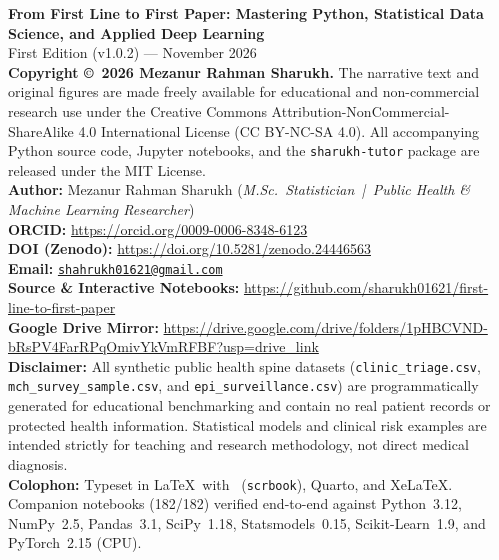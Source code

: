 {  %
  \thispagestyle{empty}
  \vspace*{\fill}
  \begin{flushleft}
  \footnotesize\color{SlateNote}
  \textbf{From First Line to First Paper: Mastering Python, Statistical Data Science, and Applied Deep Learning}\\
  First Edition (v1.0.2) --- November 2026\\[0.9em]
  \textbf{Copyright \copyright\ 2026 Mezanur Rahman Sharukh.} The narrative text and original figures are made freely available for educational and non-commercial research use under the Creative Commons Attribution-NonCommercial-ShareAlike 4.0 International License (CC BY-NC-SA 4.0). All accompanying Python source code, Jupyter notebooks, and the \texttt{sharukh-tutor} package are released under the MIT License.\\[0.9em]
  \textbf{Author:} Mezanur Rahman Sharukh (\textit{M.Sc.\ Statistician \,|\, Public Health \& Machine Learning Researcher})\\
  \textbf{ORCID:} \url{https://orcid.org/0009-0006-8348-6123}\\
  \textbf{DOI (Zenodo):} \url{https://doi.org/10.5281/zenodo.24446563}\\
  \textbf{Email:} \href{mailto:shahrukh01621@gmail.com}{\texttt{shahrukh01621@gmail.com}}\\
  \textbf{Source \& Interactive Notebooks:} \url{https://github.com/sharukh01621/first-line-to-first-paper}\\
  \textbf{Google Drive Mirror:} \url{https://drive.google.com/drive/folders/1pHBCVND-bRsPV4FarRPqOmivYkVmRFBF?usp=drive_link}\\[0.9em]
  \textbf{Disclaimer:} All synthetic public health spine datasets (\texttt{clinic\_triage.csv}, \texttt{mch\_survey\_sample.csv}, and \texttt{epi\_surveillance.csv}) are programmatically generated for educational benchmarking and contain no real patient records or protected health information. Statistical models and clinical risk examples are intended strictly for teaching and research methodology, not direct medical diagnosis.\\[0.9em]
  \textbf{Colophon:} Typeset in \LaTeX\ with \KOMAScript\ (\texttt{scrbook}), Quarto, and XeLaTeX. Companion notebooks (182/182) verified end-to-end against Python~3.12, NumPy~2.5, Pandas~3.1, SciPy~1.18, Statsmodels~0.15, Scikit-Learn~1.9, and PyTorch~2.15 (CPU).
  \end{flushleft}
  \clearpage
}
